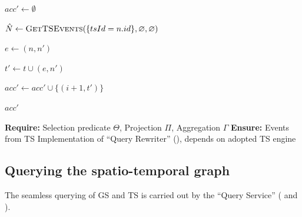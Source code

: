 \begin{algorithm}[htp]
\begin{algorithmic}[1]
    \State $acc' \gets \emptyset$
    \label{proc:qpd:init}


    \State $\hat{N} \gets \textsc{GetTSEvents}(\{tsId = n.id\}, \varnothing, \varnothing)$
    \label{proc:qpd:query-ts}

    \label{proc:qpd:iterate}

        \State $e \gets (n,n')$
        \label{proc:qpd:create-edge}

        \State $t' \gets t \cup (e,n')$ 
        \label{proc:qpd:extend-tuple}

        \State $acc' \gets acc' \cup \{(i+1,t')\}$
        \label{proc:qpd:add-state}
    \EndFor
    
    \State \Return $acc'$
    \label{proc:qpd:return}

\EndProcedure

\item[]
\label{proc:query-ts}
\Statex \hspace{\algorithmicindent}\textbf{Require:} Selection predicate $\Theta$, Projection $\Pi$, Aggregation $\Gamma$
\Statex \hspace{\algorithmicindent}\textbf{Ensure:} Events from TS
    \State Implementation of ``Query Rewriter'' (), depends on adopted TS engine
\EndProcedure

\end{algorithmic}
\end{algorithm}

\subsection{Querying the spatio-temporal graph}
The seamless querying of GS and TS is carried out by the ``Query Service'' ( and ).

